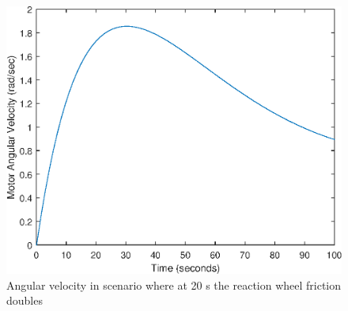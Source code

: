 \begin{figure}[h]
	\centering
	\includegraphics[width=120mm]{figures/omega_Noreconfig}
	\caption{Angular velocity in scenario where at 20 s the reaction wheel friction doubles}
	\label{fig:residualOmega}
\end{figure} 


%
%
%
%
%
%
%
%
%
%
